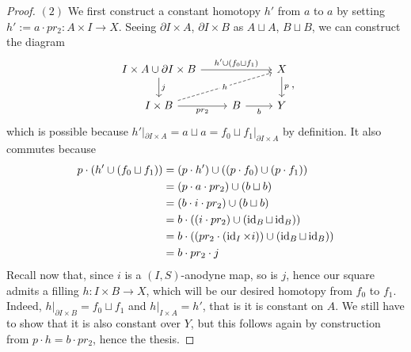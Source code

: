 \documentclass[a4paper,11pt,openany]{scrartcl}
\begin{document}
\begin{proof}
    $(2)$ We first construct a constant homotopy $h'$ from $a$ to $a$ by
    setting $h':=a\cdot pr_2\colon A\times I\rightarrow X$. Seeing $\partial
    I\times A$, $\partial
    I\times B$ as $A\sqcup A$, $B\sqcup B$, we can construct the diagram
    \[\begin{tikzcd}
        {I\times A\cup\partial I\times B} && X \\
        {I\times B} & B & Y
        \arrow["p", from=1-3, to=2-3]
        \arrow["{h'\cup(f_0\sqcup f_1)}", from=1-1, to=1-3]
        \arrow["{j}", from=1-1, to=2-1]
        \arrow["{pr_2}"', from=2-1, to=2-2]
        \arrow["b"', from=2-2, to=2-3]
        \arrow["h"{description}, dashed, from=2-1, to=1-3]
    \end{tikzcd},\]
    which is possible because $h'|_{\partial I\times A}=a\sqcup a=f_0\sqcup
    f_1|_{\partial I\times A}$ by definition. It also commutes because
    \begin{align*}
        p\cdot(h'\cup(f_0\sqcup f_1))&=(p\cdot h')\cup ((p\cdot f_0)\cup(p\cdot
        f_1)) \\
        &=(p\cdot a\cdot pr_2)\cup(b\sqcup b) \\
        &=(b\cdot i\cdot pr_2)\cup(b\sqcup b) \\
        &=b\cdot ((i\cdot pr_2)\cup(\operatorname{id}_B\sqcup\operatorname{id}_B)) \\
        &=b\cdot((pr_2\cdot (\operatorname{id}_I\times i))\cup(\operatorname{id}_B\sqcup\operatorname{id}_B)) \\
        &=b\cdot pr_2\cdot j
    \end{align*}
    Recall now that, since $i$ is a $(I,S)$-anodyne map, so is $j$, hence our
    square admits a filling $h\colon I\times B\rightarrow X$, which will be our
    desired homotopy from $f_0$ to $f_1$. Indeed, $h|_{\partial I\times
    B}=f_0\sqcup f_1$ and $h|_{I\times A}=h'$, that is it is constant on $A$. We
    still have to show that it is also constant over $Y$, but this follows again
    by construction from $p\cdot h=b\cdot pr_2$, hence the thesis.
\end{proof}
\end{document}
